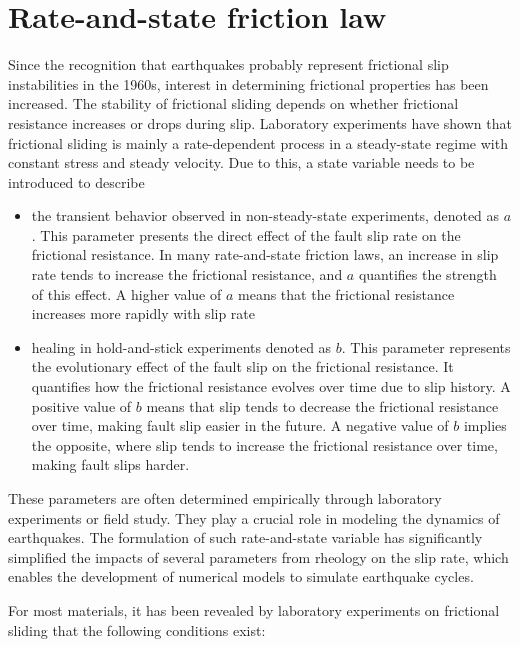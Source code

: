 \section{Rate-and-state friction law}
Since the recognition that earthquakes probably represent frictional slip instabilities in the 1960s, interest in determining frictional properties has been increased.
The stability of frictional sliding depends on whether frictional resistance increases or drops during slip.
Laboratory experiments have shown that frictional sliding is mainly a rate-dependent process in a steady-state regime with constant stress and steady velocity.
Due to this, a state variable needs to be introduced to describe
\begin{itemize}
    \item the transient behavior observed in non-steady-state experiments, denoted as $a$. This parameter presents the direct effect of the fault slip rate on the frictional resistance. In many rate-and-state friction laws, an increase in slip rate tends to increase the frictional resistance, and $a$ quantifies the strength of this effect. A higher value of $a$ means that the frictional resistance increases more rapidly with slip rate
    \item healing in hold-and-stick experiments denoted as $b$. This parameter represents the evolutionary effect of the fault slip on the frictional resistance. It quantifies how the frictional resistance evolves over time due to slip history. A positive value of $b$ means that slip tends to decrease the frictional resistance over time, making fault slip easier in the future. A negative value of $b$ implies the opposite, where slip tends to increase the frictional resistance over time, making fault slips harder.
\end{itemize}
These parameters are often determined empirically through laboratory experiments or field study. They play a crucial role in modeling the dynamics of earthquakes.
The formulation of such rate-and-state variable has significantly simplified the impacts of several parameters from rheology on the slip rate, which enables the development of numerical models to simulate earthquake cycles.

For most materials, it has been revealed by laboratory experiments on frictional sliding that the following conditions exist:

